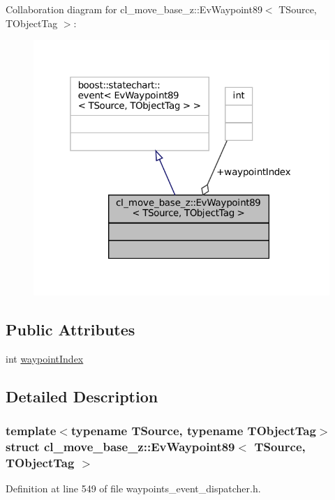 Collaboration diagram for cl\+\_\+move\+\_\+base\+\_\+z\+:\+:Ev\+Waypoint89$<$ T\+Source, T\+Object\+Tag $>$\+:
\nopagebreak
\begin{figure}[H]
\begin{center}
\leavevmode
\includegraphics[width=319pt]{structcl__move__base__z_1_1EvWaypoint89__coll__graph}
\end{center}
\end{figure}
\subsection*{Public Attributes}
\begin{DoxyCompactItemize}
\item 
int \hyperlink{structcl__move__base__z_1_1EvWaypoint89_a324fcbc33ff4825f1bcc100fb2c4d0af}{waypoint\+Index}
\end{DoxyCompactItemize}


\subsection{Detailed Description}
\subsubsection*{template$<$typename T\+Source, typename T\+Object\+Tag$>$\newline
struct cl\+\_\+move\+\_\+base\+\_\+z\+::\+Ev\+Waypoint89$<$ T\+Source, T\+Object\+Tag $>$}



Definition at line 549 of file waypoints\+\_\+event\+\_\+dispatcher.\+h.



